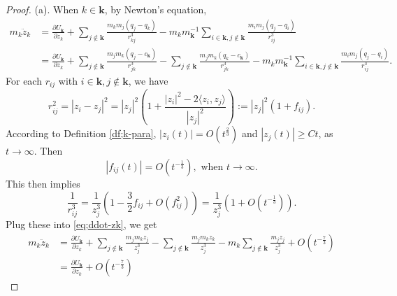 \documentclass[10pt,a4paper]{amsart}
\newcommand{\bk}{\mathbf k}
\begin{document}
\begin{proof}
(a). When $k \in \bk$, by Newton's equation, 
\begin{equation}
 \label{eq;ddot-zk} \begin{aligned}
 m_k\ddot{z}_k&=\frac{\partial U_\mathbf{k}}{\partial z_k}+\sum_{j\notin\mathbf{k}}\frac{m_km_j(q_j-q_k)}{r_{kj}^3}-m_km_\mathbf{k}^{-1}\sum_{i\in\mathbf{k},j\notin\mathbf{k}}\frac{m_im_j(q_j-q_i)}{r_{ij}^3}\\
    &=\frac{\partial U_\mathbf{k}}{\partial z_k}+\sum_{j\notin\mathbf{k}}\frac{m_jm_k(q_j-c_{\mathbf{k}})}{r_{jk}^3}-\sum_{j\notin\mathbf{k}}\frac{m_jm_k(q_k-c_{\mathbf{k}})}{r_{jk}^3}-m_km_\mathbf{k}^{-1}\sum_{i\in\mathbf{k},j\notin\mathbf{k}}\frac{m_im_j(q_j-q_i)}{r_{ij}^3}.
 \end{aligned}
 \end{equation}  
For each $r_{ij}$ with $i\in\mathbf{k}, j\notin\mathbf{k}$, we have
$$ r_{ij}^2 = |z_i -z_j|^2 = |z_j|^2 \left( 1+ \frac{|z_i|^2 - 2 \langle z_i, z_j\rangle}{|z_j|^2} \right) := |z_j|^2( 1 + f_{ij}). $$
According to Definition \ref{df;k-para}, $|z_i(t)|=O(t^{\frac{2}{3}})$ and $|z_j(t)|\ge Ct$, as $t\rightarrow \infty$. Then
$$|f_{ij}(t)|=O(t^{-\frac{1}{3}}), \text{ when } t \to \infty.$$
This then implies 
\begin{equation*}
    \frac{1}{r_{ij}^3}=\frac{1}{z_{j}^3}(1-\frac{3}{2}f_{ij}+O(f_{ij}^2))=\frac{1}{z_j^3}(1+O(t^{-\frac{1}{3}})).
\end{equation*}
Plug these into \eqref{eq;ddot-zk}, we get  
\begin{align*}
    m_k\ddot{z}_k&=\frac{\partial U_\mathbf{k}}{\partial z_k}+\sum_{j\notin\mathbf{k}}\frac{m_jm_kz_j}{z_j^3}-\sum_{j\notin\mathbf{k}}\frac{m_jm_kz_k}{z_j^3}-m_k\sum_{j\notin\mathbf{k}}\frac{m_jz_j}{z_j^3}+O(t^{-\frac{7}{3}})\\
    &=\frac{\partial U_\mathbf{k}}{\partial z_k}+O(t^{-\frac{7}{3}}) 
\end{align*}
\end{proof}
\end{document}
